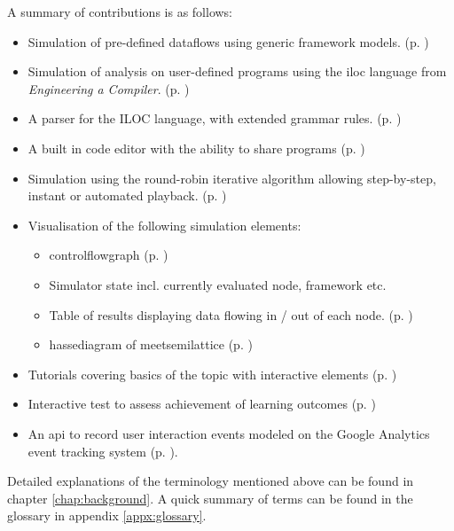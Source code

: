 \documentclass[bsc,twoside,singlespacing,parskip,logo,notimes,normalheadings]{infthesis}
\begin{document}
    A summary of contributions is as follows:
    
    \begin{itemize}[leftmargin=7mm]
    \item Simulation of pre-defined \gls{dataflow}s using generic
      framework models. (p. \pageref{sec:impl-dataflows})
    \item Simulation of analysis on user-defined programs using the
      \gls{iloc}\cite[appx.~A]{eac} \break language from {\em Engineering a
        Compiler}. (p. \pageref{sec:impl-iloc})
    \item A parser for the ILOC language, with extended grammar
      rules. (p. \pageref{sec:peg})
    \item A built in code editor with the ability to share programs (p. \pageref{sec:code-display})
    \item Simulation using the round-robin iterative algorithm
      allowing step-by-step, instant or automated
      playback. (p. \pageref{sec:impl-simulation})
    \item Visualisation of the following simulation elements:
      \begin{itemize}
      \item \Gls{controlflowgraph} (p. \pageref{sec:impl-visual-cfg})
      \item Simulator state incl. currently evaluated node,
        framework etc.
      \item Table of results displaying data flowing in / out of each
        node. (p. \pageref{sec:impl-visual-results})
      \item \Gls{hassediagram} of \gls{meetsemilattice}
        (p. \pageref{sec:impl-visual-hasse})
      \end{itemize}
    \item Tutorials covering basics of the topic with interactive
      elements (p. \pageref{sec:impl-tutorials})
    \item Interactive test to assess achievement of learning outcomes
      (p. \pageref{sec:impl-testing})
    \item An \gls{api} to record user interaction events modeled on
      the Google Analytics event tracking system
      (p. \pageref{sec:impl-tracking-api}).
    \end{itemize}

    Detailed explanations of the terminology mentioned above can be
    found in chapter \ref{chap:background}. A quick summary of terms
    can be found in the glossary in appendix \ref{appx:glossary}.
\end{document}
